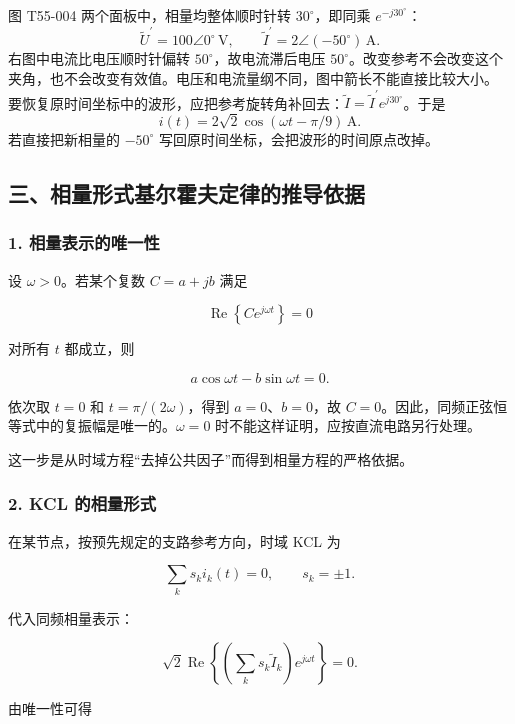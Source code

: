 图 T55-004 两个面板中，相量均整体顺时针转 \(30^{\circ}\)，即同乘
\(e^{-j30^{\circ}}\)：
\[\widetilde U^{\prime}=100\angle0^{\circ}\,\mathrm V,\qquad
\widetilde I^{\prime}=2\angle(-50^{\circ})\,\mathrm A.\]
右图中电流比电压顺时针偏转 \(50^{\circ}\)，故电流滞后电压
\(50^{\circ}\)。改变参考不会改变这个夹角，也不会改变有效值。电压和电流量纲不同，图中箭长不能直接比较大小。
要恢复原时间坐标中的波形，应把参考旋转角补回去：\(\widetilde I=\widetilde I^{\prime}e^{j30^{\circ}}\)。于是
\[\boxed{i(t)=2\sqrt2\cos(\omega t-\pi/9)\,\mathrm A.}\]
若直接把新相量的 \(-50^{\circ}\)
写回原时间坐标，会把波形的时间原点改掉。

\subsection{三、相量形式基尔霍夫定律的推导依据}\label{m6:ux4e09ux76f8ux91cfux5f62ux5f0fux57faux5c14ux970dux592bux5b9aux5f8bux7684ux63a8ux5bfcux4f9dux636e}

\subsubsection{1.
相量表示的唯一性}\label{m6:ux76f8ux91cfux8868ux793aux7684ux552fux4e00ux6027}

设 \(\omega>0\)。若某个复数 \(C=a+jb\) 满足

\[
\operatorname{Re}\!\left\{Ce^{j\omega t}\right\}=0
\]

对所有 \(t\) 都成立，则

\[
a\cos\omega t-b\sin\omega t=0.
\]

依次取 \(t=0\) 和 \(t=\pi/(2\omega)\)，得到 \(a=0\)、\(b=0\)，故
\(C=0\)。因此，同频正弦恒等式中的复振幅是唯一的。\(\omega=0\)
时不能这样证明，应按直流电路另行处理。

这一步是从时域方程``去掉公共因子''而得到相量方程的严格依据。

\subsubsection{2. KCL
的相量形式}\label{m6:kcl-ux7684ux76f8ux91cfux5f62ux5f0f}

在某节点，按预先规定的支路参考方向，时域 KCL 为

\[
\sum_k s_k i_k(t)=0,
\qquad s_k=\pm1.
\]

代入同频相量表示：

\[
\sqrt2\operatorname{Re}\!\left\{
\left(\sum_k s_k\widetilde I_k\right)e^{j\omega t}
\right\}=0.
\]

由唯一性可得

